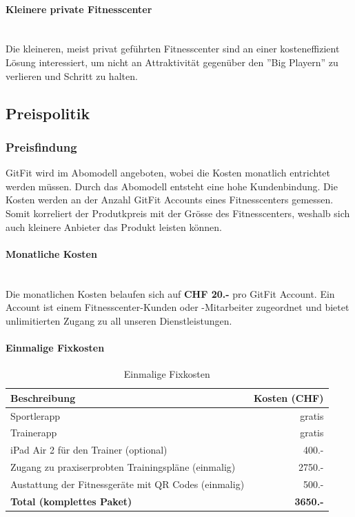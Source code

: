 \paragraph{Kleinere private Fitnesscenter} \hfill \\
Die kleineren, meist privat geführten Fitnesscenter sind an einer kosteneffizient Lösung interessiert, um nicht an Attraktivität gegenüber den ''Big Playern'' zu verlieren und Schritt zu halten. 


\subsection{Preispolitik}\label{sec:preispolitik}
\subsubsection{Preisfindung}
GitFit wird im Abomodell angeboten, wobei die Kosten monatlich entrichtet werden müssen. Durch das Abomodell entsteht eine hohe Kundenbindung. Die Kosten werden an der Anzahl GitFit Accounts eines Fitnesscenters gemessen. Somit korreliert der Produtkpreis mit der Grösse des Fitnesscenters, weshalb sich auch kleinere Anbieter das Produkt leisten können.

\paragraph{Monatliche Kosten} \hfill \\
Die monatlichen Kosten belaufen sich auf \textbf{CHF 20.-} pro GitFit Account. Ein Account ist einem Fitnesscenter-Kunden oder -Mitarbeiter zugeordnet und bietet unlimitierten Zugang zu all unseren Dienstleistungen.

\paragraph{Einmalige Fixkosten} \hfill
\begin{table}[h]
	\centering
	\begin{tabu} to \linewidth {l r}
		\toprule 
		Beschreibung & Kosten (CHF) \\
		\midrule
		Sportlerapp & gratis \\
		Trainerapp & gratis \\
		iPad Air 2 für den Trainer (optional) & 400.- \\
		Zugang zu praxiserprobten Trainingspläne (einmalig) & 2750.- \\
		Austattung der Fitnessgeräte mit QR Codes (einmalig) & 500.-  \\
		\midrule
		\textbf{Total (komplettes Paket)} & \textbf{3650.-} \\
		\bottomrule 
	\end{tabu} 
	\caption{Einmalige Fixkosten}
\end{table}

